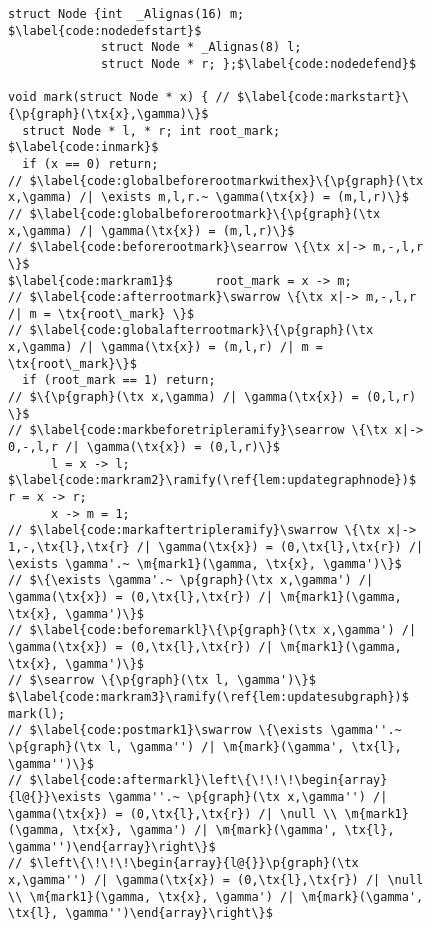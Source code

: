 \begin{figure}[t]
\vspace{-1ex}
  \begin{lstlisting}
struct Node {int  _Alignas(16) m; $\label{code:nodedefstart}$
             struct Node * _Alignas(8) l;
             struct Node * r; };$\label{code:nodedefend}$

void mark(struct Node * x) { // $\label{code:markstart}\{\p{graph}(\tx{x},\gamma)\}$
  struct Node * l, * r; int root_mark; $\label{code:inmark}$
  if (x == 0) return;
// $\label{code:globalbeforerootmarkwithex}\{\p{graph}(\tx x,\gamma) /| \exists m,l,r.~ \gamma(\tx{x}) = (m,l,r)\}$
// $\label{code:globalbeforerootmark}\{\p{graph}(\tx x,\gamma) /| \gamma(\tx{x}) = (m,l,r)\}$
// $\label{code:beforerootmark}\searrow \{\tx x|-> m,-,l,r \}$
$\label{code:markram1}$      root_mark = x -> m;
// $\label{code:afterrootmark}\swarrow \{\tx x|-> m,-,l,r /| m = \tx{root\_mark} \}$
// $\label{code:globalafterrootmark}\{\p{graph}(\tx x,\gamma) /| \gamma(\tx{x}) = (m,l,r) /| m = \tx{root\_mark}\}$
  if (root_mark == 1) return;
// $\{\p{graph}(\tx x,\gamma) /| \gamma(\tx{x}) = (0,l,r) \}$
// $\label{code:markbeforetripleramify}\searrow \{\tx x|-> 0,-,l,r /| \gamma(\tx{x}) = (0,l,r)\}$
      l = x -> l;
$\label{code:markram2}\ramify(\ref{lem:updategraphnode})$      r = x -> r;
      x -> m = 1;
// $\label{code:markaftertripleramify}\swarrow \{\tx x|-> 1,-,\tx{l},\tx{r} /| \gamma(\tx{x}) = (0,\tx{l},\tx{r}) /| \exists \gamma'.~ \m{mark1}(\gamma, \tx{x}, \gamma')\}$
// $\{\exists \gamma'.~ \p{graph}(\tx x,\gamma') /| \gamma(\tx{x}) = (0,\tx{l},\tx{r}) /| \m{mark1}(\gamma, \tx{x}, \gamma')\}$
// $\label{code:beforemarkl}\{\p{graph}(\tx x,\gamma') /| \gamma(\tx{x}) = (0,\tx{l},\tx{r}) /| \m{mark1}(\gamma, \tx{x}, \gamma')\}$
// $\searrow \{\p{graph}(\tx l, \gamma')\}$
$\label{code:markram3}\ramify(\ref{lem:updatesubgraph})$      mark(l);
// $\label{code:postmark1}\swarrow \{\exists \gamma''.~ \p{graph}(\tx l, \gamma'') /| \m{mark}(\gamma', \tx{l}, \gamma'')\}$
// $\label{code:aftermarkl}\left\{\!\!\!\begin{array}{l@{}}\exists \gamma''.~ \p{graph}(\tx x,\gamma'') /| \gamma(\tx{x}) = (0,\tx{l},\tx{r}) /| \null \\ \m{mark1}(\gamma, \tx{x}, \gamma') /| \m{mark}(\gamma', \tx{l}, \gamma'')\end{array}\right\}$
// $\left\{\!\!\!\begin{array}{l@{}}\p{graph}(\tx x,\gamma'') /| \gamma(\tx{x}) = (0,\tx{l},\tx{r}) /| \null \\ \m{mark1}(\gamma, \tx{x}, \gamma') /| \m{mark}(\gamma', \tx{l}, \gamma'')\end{array}\right\}$

\end{lstlisting}
\end{figure}
